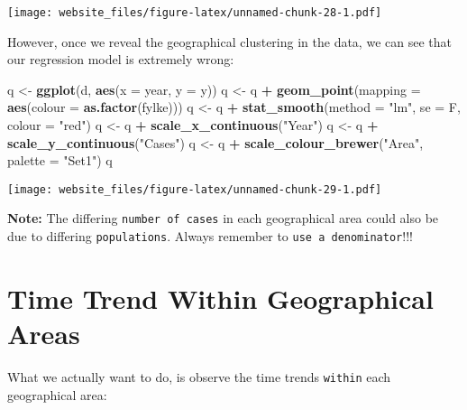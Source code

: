 \documentclass[]{book}
\newenvironment{Shaded}{\begin{snugshade}}{\end{snugshade}}
\newcommand{\KeywordTok}[1]{\textcolor[rgb]{0.13,0.29,0.53}{\textbf{#1}}}
\newcommand{\DataTypeTok}[1]{\textcolor[rgb]{0.13,0.29,0.53}{#1}}
\newcommand{\StringTok}[1]{\textcolor[rgb]{0.31,0.60,0.02}{#1}}
\newcommand{\OperatorTok}[1]{\textcolor[rgb]{0.81,0.36,0.00}{\textbf{#1}}}
\newcommand{\NormalTok}[1]{#1}
\begin{document}
\texttt{[image: website\_files/figure-latex/unnamed-chunk-28-1.pdf]}

However, once we reveal the geographical clustering in the data, we can
see that our regression model is extremely wrong:

\begin{Shaded}
\begin{Highlighting}[]
\NormalTok{q <-}\StringTok{ }\KeywordTok{ggplot}\NormalTok{(d, }\KeywordTok{aes}\NormalTok{(}\DataTypeTok{x =}\NormalTok{ year, }\DataTypeTok{y =}\NormalTok{ y))}
\NormalTok{q <-}\StringTok{ }\NormalTok{q }\OperatorTok{+}\StringTok{ }\KeywordTok{geom_point}\NormalTok{(}\DataTypeTok{mapping =} \KeywordTok{aes}\NormalTok{(}\DataTypeTok{colour =} \KeywordTok{as.factor}\NormalTok{(fylke)))}
\NormalTok{q <-}\StringTok{ }\NormalTok{q }\OperatorTok{+}\StringTok{ }\KeywordTok{stat_smooth}\NormalTok{(}\DataTypeTok{method =} \StringTok{"lm"}\NormalTok{, }\DataTypeTok{se =}\NormalTok{ F, }\DataTypeTok{colour =} \StringTok{"red"}\NormalTok{)}
\NormalTok{q <-}\StringTok{ }\NormalTok{q }\OperatorTok{+}\StringTok{ }\KeywordTok{scale_x_continuous}\NormalTok{(}\StringTok{"Year"}\NormalTok{)}
\NormalTok{q <-}\StringTok{ }\NormalTok{q }\OperatorTok{+}\StringTok{ }\KeywordTok{scale_y_continuous}\NormalTok{(}\StringTok{"Cases"}\NormalTok{)}
\NormalTok{q <-}\StringTok{ }\NormalTok{q }\OperatorTok{+}\StringTok{ }\KeywordTok{scale_colour_brewer}\NormalTok{(}\StringTok{"Area"}\NormalTok{, }\DataTypeTok{palette =} \StringTok{"Set1"}\NormalTok{)}
\NormalTok{q}
\end{Highlighting}
\end{Shaded}

\texttt{[image: website\_files/figure-latex/unnamed-chunk-29-1.pdf]}

\textbf{Note:} The differing \texttt{number\ of\ cases} in each
geographical area could also be due to differing \texttt{populations}.
Always remember to \texttt{use\ a\ denominator}!!!

\section{Time Trend Within Geographical
Areas}\label{time-trend-within-geographical-areas}

What we actually want to do, is observe the time trends \texttt{within}
each geographical area:
\end{document}
